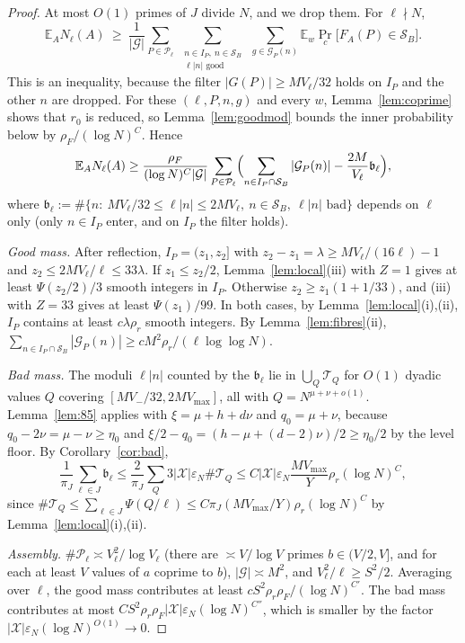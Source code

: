 \documentclass[11pt]{amsart}
\theoremstyle{definition}
\newcommand{\cG}{\mathcal{G}}
\newcommand{\cP}{\mathcal{P}}
\newcommand{\cS}{\mathcal{S}}
\newcommand{\cT}{\mathcal{T}}
\newcommand{\cX}{\mathcal{X}}
\newcommand{\Vm}{V_{-}}
\newcommand{\VM}{V_{\max}}
\newcommand{\rr}{\rho_r}
\newcommand{\rF}{\rho_F}
\newcommand{\Ex}{\mathbb{E}}
\newcommand{\Prob}{\Pr}
\begin{document}
\begin{proof}
At most $O(1)$ primes of $J$ divide $N$, and we drop them. For $\ell\nmid N$,
\[
\Ex_AN_\ell(A)\ \ge\ \frac1{|\cG|}\sum_{P\in\cP_\ell}\ \sum_{\substack{n\in I_P,\ n\in\cS_B\\ \ell|n|\text{ good}}}\ \sum_{g\in\cG_P(n)}\Ex_w\Prob_c\bigl[F_A(P)\in\cS_B\bigr].
\]
This is an inequality, because the filter $|G(P)|\ge MV_\ell/32$ holds on $I_P$ and the other $n$ are dropped. For these
$(\ell,P,n,g)$ and every $w$, Lemma~\ref{lem:coprime} shows that $r_0$ is reduced, so Lemma~\ref{lem:goodmod} bounds the inner
probability below by $\rF/(\log N)^C$. Hence
\[
\Ex_AN_\ell(A)\ge\frac{\rF}{(\log N)^C|\cG|}\sum_{P\in\cP_\ell}\Bigl(\sum_{n\in I_P\cap\cS_B}|\cG_P(n)|-\frac{2M}{V_\ell}\mathfrak b_\ell\Bigr),
\]
where $\mathfrak b_\ell:=\#\{n:\ MV_\ell/32\le\ell|n|\le2MV_\ell,\ n\in\cS_B,\ \ell|n|\text{ bad}\}$ depends on $\ell$ only (only $n\in I_P$
enter, and on $I_P$ the filter holds).

\emph{Good mass.} After reflection, $I_P=(z_1,z_2]$ with $z_2-z_1=\lambda\ge MV_\ell/(16\ell)-1$ and $z_2\le2MV_\ell/\ell\le33\lambda$. If
$z_1\le z_2/2$, Lemma~\ref{lem:local}(iii) with $Z=1$ gives at least $\Psi(z_2/2)/3$ smooth integers in $I_P$. Otherwise
$z_2\ge z_1(1+1/33)$, and (iii) with $Z=33$ gives at least $\Psi(z_1)/99$. In both cases, by Lemma~\ref{lem:local}(i),(ii), $I_P$ contains
at least $c\lambda\rr$ smooth integers. By Lemma~\ref{lem:fibres}(ii),
$\sum_{n\in I_P\cap\cS_B}|\cG_P(n)|\ge cM^2\rr/(\ell\log\log N)$.

\emph{Bad mass.} The moduli $\ell|n|$ counted by the $\mathfrak b_\ell$ lie in $\bigcup_Q\cT_Q$ for $O(1)$ dyadic values $Q$ covering
$[M\Vm/32,2M\VM]$, all with $Q=N^{\mu+\nu+o(1)}$. Lemma~\ref{lem:85} applies with $\xi=\mu+h+d\nu$ and $q_0=\mu+\nu$, because
$q_0-2\nu=\mu-\nu\ge\eta_0$ and $\xi/2-q_0=(h-\mu+(d-2)\nu)/2\ge\eta_0/2$ by the level floor. By Corollary~\ref{cor:bad},
\[
\frac1{\pi_J}\sum_{\ell\in J}\mathfrak b_\ell\le\frac{2}{\pi_J}\sum_Q3|\cX|\varepsilon_N\#\cT_Q
\le C|\cX|\varepsilon_N\frac{M\VM}{Y}\rr(\log N)^C,
\]
since $\#\cT_Q\le\sum_{\ell\in J}\Psi(Q/\ell)\le C\pi_J(M\VM/Y)\rr(\log N)^C$ by Lemma~\ref{lem:local}(i),(ii).

\emph{Assembly.} $\#\cP_\ell\asymp V_\ell^2/\log V_\ell$ (there are $\asymp V/\log V$ primes $b\in(V/2,V]$, and for each at least $V$ values of
$a$ coprime to $b$), $|\cG|\asymp M^2$, and $V_\ell^2/\ell\ge S^2/2$. Averaging over $\ell$, the good mass contributes at least
$cS^2\rr\rF/(\log N)^{C'}$. The bad mass contributes at most $CS^2\rr\rF|\cX|\varepsilon_N(\log N)^{C''}$, which is smaller by the factor
$|\cX|\varepsilon_N(\log N)^{O(1)}\to0$.
\end{proof}
\end{document}
